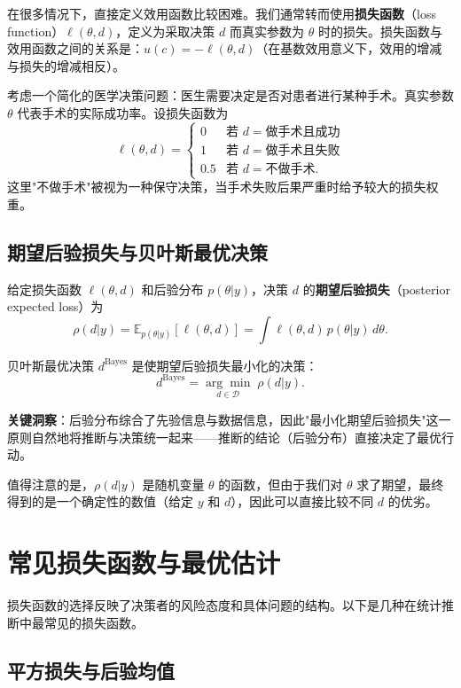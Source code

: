 在很多情况下，直接定义效用函数比较困难。我们通常转而使用\textbf{损失函数}（loss function）$\ell(\theta, d)$，定义为采取决策 $d$ 而真实参数为 $\theta$ 时的损失。损失函数与效用函数之间的关系是：$u(c) = - \ell(\theta, d)$（在基数效用意义下，效用的增减与损失的增减相反）。

\begin{Example}[医学治疗决策]
  考虑一个简化的医学决策问题：医生需要决定是否对患者进行某种手术。真实参数 $\theta$ 代表手术的实际成功率。设损失函数为
  \[
  \ell(\theta, d) = \begin{cases}
    0 & \text{若 } d = \text{做手术且成功} \\
    1 & \text{若 } d = \text{做手术且失败} \\
    0.5 & \text{若 } d = \text{不做手术}.
  \end{cases}
  \]
  这里"不做手术"被视为一种保守决策，当手术失败后果严重时给予较大的损失权重。
\end{Example}

\subsection{期望后验损失与贝叶斯最优决策}

给定损失函数 $\ell(\theta, d)$ 和后验分布 $p(\theta | y)$，决策 $d$ 的\textbf{期望后验损失}（posterior expected loss）为
\[
\rho(d | y) = \mathbb{E}_{p(\theta|y)}[\ell(\theta, d)] = \int \ell(\theta, d) \, p(\theta | y) \, d\theta.
\]

贝叶斯最优决策 $d^{\text{Bayes}}$ 是使期望后验损失最小化的决策：
\[
d^{\text{Bayes}} = \underset{d \in \mathcal{D}}{\arg\min} \; \rho(d | y).
\]

\textbf{关键洞察}：后验分布综合了先验信息与数据信息，因此"最小化期望后验损失"这一原则自然地将推断与决策统一起来——推断的结论（后验分布）直接决定了最优行动。

值得注意的是，$\rho(d | y)$ 是随机变量 $\theta$ 的函数，但由于我们对 $\theta$ 求了期望，最终得到的是一个确定性的数值（给定 $y$ 和 $d$），因此可以直接比较不同 $d$ 的优劣。

\section{常见损失函数与最优估计}

损失函数的选择反映了决策者的风险态度和具体问题的结构。以下是几种在统计推断中最常见的损失函数。

\subsection{平方损失与后验均值}

